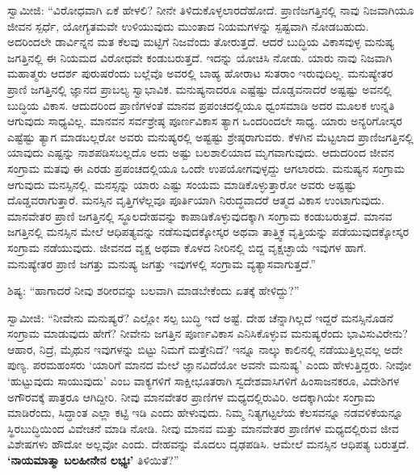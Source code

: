  ಸ್ವಾಮೀಜಿ: “ವಿರೋಧವಾಗಿ ಏಕೆ ಹೇಳಲಿ? ನೀನೇ ತಿಳಿದುಕೊಳ್ಳಲಾರದೆಹೋದೆ. ಪ್ರಾಣಿಜಗತ್ತಿನಲ್ಲಿ ನಾವು ನಿಜವಾಗಿಯೂ ಜೀವನ ಸ್ಪರ್ಧೆ, ಯೋಗ್ಯತಮವೇ ಉಳಿಯುವುದು ಮುಂತಾದ ನಿಯಮಗಳನ್ನು ಸ್ಪಷ್ಟವಾಗಿ ನೋಡಬಹುದು. ಅದರಿಂದಲೇ ಡಾರ್ವಿನ್ನನ ಮತ ಕೆಲವು ಮಟ್ಟಿಗೆ ನಿಜವೆಂದು ತೋರುತ್ತದೆ. ಆದರೆ ಬುದ್ಧಿಯ ವಿಕಾಸವುಳ್ಳ ಮನುಷ್ಯ ಜಗತ್ತಿನಲ್ಲಿ ಈ ನಿಯಮದ ವಿರೋಧವೇ ಕಂಡುಬರುತ್ತದೆ. ಇದನ್ನು ಯೋಚಿಸಿ ನೋಡು. ಯಾರು ನಾವು ನಿಜವಾಗಿ ಮಹಾತ್ಮರು ಆದರ್ಶ ಪುರುಷರೆಂದು ಬಲ್ಲೆವೊ ಅವರಲ್ಲಿ ಬಾಹ್ಯ ಹೋರಾಟ ಸುತರಾಂ ಇರುವುದಿಲ್ಲ. ಮನುಷ್ಯೇತರ ಪ್ರಾಣಿ ಜಗತ್ತಿನಲ್ಲಿ ಜ್ಞಾನದ ಪ್ರಾಬಲ್ಯ ಸ್ವಾಭಾವಿಕ. ಮನುಷ್ಯನಾದರೂ ಎಷ್ಟೆಷ್ಟು ದೊಡ್ಡವನಾದರೆ ಅಷ್ಟಷ್ಟು ಅವನಲ್ಲಿ ಬುದ್ಧಿಯ ವಿಕಾಸ. ಆದುದರಿಂದ ಪ್ರಾಣಿಗಳಂತೆ ಮಾನವ ಪ್ರಪಂಚದಲ್ಲಿಯೂ ಧ್ವಂಸಮಾಡಿ ಅದರ ಮೂಲಕ ಉನ್ನತಿ ಆಗುವುದು ಸಾಧ್ಯವಿಲ್ಲ. ಮಾನವನ ಸರ್ವಶ್ರೇಷ್ಠ ಪೂರ್ಣವಿಕಾಸ ತ್ಯಾಗ ಒಂದರಿಂದಲೇ ಸಾಧ್ಯ. ಯಾರು ಅನ್ಯರಿಗೋಸ್ಕರ ಎಷ್ಟೆಷ್ಟು ತ್ಯಾಗ ಮಾಡಬಲ್ಲರೋ ಅವರು ಮನುಷ್ಯರಲ್ಲಿ ಅಷ್ಟಷ್ಟು ಶ್ರೇಷ್ಠರಾಗುವರು. ಕೆಳಗಿನ ಮೆಟ್ಟಲಾದ ಪ್ರಾಣಿಜಗತ್ತಿನಲ್ಲಿ ಯಾವುದು ಎಷ್ಟನ್ನು ನಾಶಪಡಿಸಬಲ್ಲದೊ ಅದು ಅಷ್ಟು ಬಲಶಾಲಿಯಾದ ಮೃಗವಾಗುವುದು. ಆದುದರಿಂದ ಜೀವನ ಸಂಗ್ರಾಮ ಮತವು ಈ ಎರಡು ಪ್ರಪಂಚದಲ್ಲಿಯೂ ಒಂದೇ ಉಪಯೋಗವುಳ್ಳದ್ದು ಆಗಲಾರದು. ಮನುಷ್ಯನ ಸಂಗ್ರಾಮ ಆಗುವುದು ಮನಸ್ಸಿನಲ್ಲಿ. ಮನಸ್ಸನ್ನು ಯಾರು ಎಷ್ಟು ಸಂಯಮ ಮಾಡಿಕೊಳ್ಳುತ್ತಾರೋ ಅವರು ಅಷ್ಟಷ್ಟು ದೊಡ್ಡವರಾಗುತ್ತಾರೆ. ಮನಸ್ಸಿನ ವೃತ್ತಿಗಳೆಲ್ಲವೂ ಪೂರ್ತಿಯಾಗಿ ನಿರುದ್ಧವಾದರೆ ಆತ್ಮದ ವಿಕಾಸ ಉಂಟಾಗುವುದು. ಮಾನವೇತರ ಪ್ರಾಣಿ ಜಗತ್ತಿನಲ್ಲಿ ಸ್ಥೂಲದೇಹವನ್ನು ಕಾಪಾಡಿಕೊಳ್ಳುವುದಕ್ಕಾಗಿ ಸಂಗ್ರಾಮ ಕಂಡುಬರುತ್ತದೆ. ಮಾನವ ಜಗತ್ತಿನಲ್ಲಿ ಮನಸ್ಸಿನ ಮೇಲೆ ಆಧಿಪತ್ಯವನ್ನು ನಡೆಸುವುದಕ್ಕೋಸ್ಕರ ಅಥವಾ ತಾತ್ತ್ವಿಕ ವೃತ್ತಿಯನ್ನು ಪಡೆಯುವುದಕ್ಕೋಸ್ಕರ ಸಂಗ್ರಾಮ ನಡೆಯುವುದು. ಜೀವನದ ವೃಕ್ಷ ಅಥವಾ ಕೊಳದ ನೀರಿನಲ್ಲಿ ಬಿದ್ದ ವೃಕ್ಷಚ್ಛಾಯೆ ಇವುಗಳ ಹಾಗೆ. ಮನುಷ್ಯೇತರ ಪ್ರಾಣಿ ಜಗತ್ತು ಮನುಷ್ಯ ಜಗತ್ತು ಇವುಗಳಲ್ಲಿ ಸಂಗ್ರಾಮ ವ್ಯತ್ಯಾಸವಾಗುತ್ತದೆ.”‌ 

 ಶಿಷ್ಯ: “ಹಾಗಾದರೆ ನೀವು ಶರೀರವನ್ನು ಬಲವಾಗಿ ಮಾಡಬೇಕೆಂದು ಏತಕ್ಕೆ ಹೇಳಿದ್ದು?” 

 ಸ್ವಾಮೀಜಿ: “ನೀವೇನು ಮನುಷ್ಯರೆ? ಎಲ್ಲೋ ಸಲ್ಪ ಬುದ್ಧಿ ಇದೆ ಅಷ್ಟೆ. ದೇಹ ಚೆನ್ನಾಗಿಲ್ಲದೆ ಇದ್ದರೆ ಮನಸ್ಸಿನೊಡನೆ ಸಂಗ್ರಾಮ ಮಾಡುವುದು ಹೇಗೆ? ನೀವೇನು ಜಗತ್ತಿನ ಪೂರ್ಣವಿಕಾಸ ಎನಿಸಿಕೊಳ್ಳುವ ಮನುಷ್ಯರೆಂದು ಭಾವಿಸುವಿರೇನು? ಆಹಾರ, ನಿದ್ರೆ, ಮೈಥುನ ಇವುಗಳನ್ನು ಬಿಟ್ಟು ನಿಮಗೆ ಮತ್ತೇನಿದೆ? ಇನ್ನೂ ನಾಲ್ಕು ಕಾಲಿನಲ್ಲಿ ನಡೆಯುತ್ತಿಲ್ಲವಲ್ಲ ಅದೇ ಪುಣ್ಯ. ಪರಮಹಂಸರು ‘ಯಾರಿಗೆ ಮಾನದ ಮೇಲೆ ಜ್ಞಾನವಿದೆಯೋ ಅವನೇ ಮನುಷ್ಯ’ ಎಂದು ಹೇಳುತ್ತಿದ್ದರು. ನೀವೋ ‘ಹುಟ್ಟುವುದು ಸಾಯುವುದು’ ಎಂಬ ವಾಕ್ಯಗಳಿಗೆ ಸಾಕ್ಷೀಭೂತರಾಗಿ ಸ್ವದೇಶವಾಸಿಗಳಿಗೆ ಹಿಂಸಾಜನಕರೂ, ವಿದೇಶಿಗಳ ಅಗೌರವಕ್ಕೆ ಪಾತ್ರರೂ ಆಗಿದ್ದೀರಿ. ನೀವು ಮಾನವೇತರ ಪ್ರಾಣಿಗಳ ಮಧ್ಯದಲ್ಲಿರುವಿರಿ. ಅದಕ್ಕಾಗಿಯೇ ಸಂಗ್ರಾಮ ಮಾಡಿರೆಂದು, ಸಿದ್ಧಾಂತ ಎಲ್ಲಾ ಕಟ್ಟಿ ಇಡಿ ಎಂದು ಹೇಳುವುದು. ನಿಮ್ಮ ನಿತ್ಯಗಟ್ಟಲೆಯ ಕೆಲಸವನ್ನೂ ನಡವಳಿಕೆಯನ್ನೂ ಸ್ಥಿರಬುದ್ಧಿಯಿಂದ ವಿವೇಚನೆ ಮಾಡಿ ನೋಡಿ. ನೀವು ಮಾನವ ಮತ್ತು ಮಾನವೇತರ ಪ್ರಾಣಿಗಳ ಮಧ್ಯದಲ್ಲಿರುವ ಜೀವ ವಿಶೇಷಗಳು ಹೌದೋ ಅಲ್ಲವೋ ಎಂದು. ದೇಹವನ್ನು ಮೊದಲು ದೃಢಪಡಿಸಿ. ಆಮೇಲೆ ಮನಸ್ಸಿನ ಆಧಿಪತ್ಯ ಬರುತ್ತದೆ. \textbf{‘ನಾಯಮಾತ್ಮಾ ಬಲಹೀನೇನ ಲಭ್ಯಃ’} ತಿಳಿಯಿತೆ?” 


